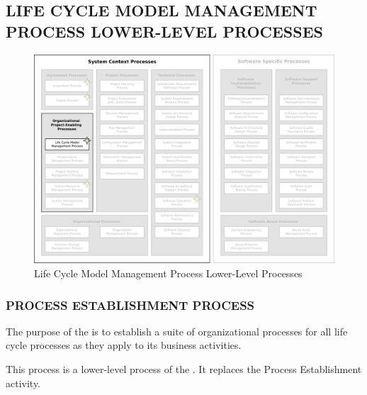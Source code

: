 	\subsection{LIFE CYCLE MODEL MANAGEMENT PROCESS LOWER-LEVEL PROCESSES\label{llsubsec:life_cycle_model_management_processes}}
	\begin{figure}[h]
		\centering
		\includegraphics[width=15cm,keepaspectratio]{figures/life-cycle-process-groups-lower-level-life-cycle-model-management-processes.pdf}
		\caption{Life Cycle Model Management Process Lower-Level Processes}
		\label{fig:lower_level_life_cycle_model_management_processes}
	\end{figure}

		\subsubsection{PROCESS ESTABLISHMENT PROCESS\label{llproc:process_establishment_process}}

			\begin{adjustwidth}{2em}{0pt} 

				The purpose of the  is to establish a suite of organizational processes for all life cycle processes as they apply to its business activities.

				This process is a lower-level process of the . It replaces the Process Establishment activity.

			\end{adjustwidth}

